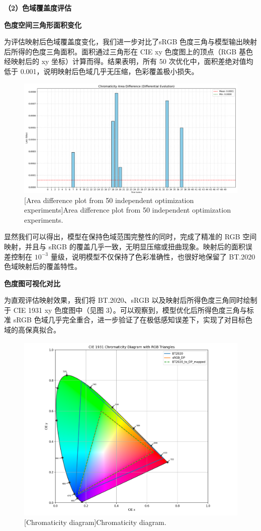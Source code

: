 \noindent\textbf{（2）色域覆盖度评估}

 \textbf{色度空间三角形面积变化}

为评估映射后色域覆盖度变化，我们进一步对比了sRGB 色度三角与模型输出映射后所得的色度三角面积。面积通过三角形在 CIE xy 色度图上的顶点（RGB 基色经映射后的 xy 坐标）计算而得。结果表明，所有 50 次优化中，面积差绝对值均低于 0.001，说明映射后色域几乎无压缩，色彩覆盖极小损失。

\begin{figure}[h]
\centering
{}
\includegraphics[width=0.8\columnwidth]{figures/面积Loss.png}
[Area difference plot from 50 independent optimization experiments]{Area difference plot from 50 independent optimization experiments.}
\label{figure3: 面积diff}
\end{figure}

显然我们可以得出，模型在保持色域范围完整性的同时，完成了精准的 RGB 空间映射，并且与 sRGB 的覆盖几乎一致，无明显压缩或扭曲现象。映射后的面积误差控制在 $10^{-3}$ 量级，说明模型不仅保持了色彩准确性，也很好地保留了 BT.2020 色域映射后的覆盖特性。

 \textbf{色度图可视化对比}

为直观评估映射效果，我们将 BT.2020、sRGB 以及映射后所得色度三角同时绘制于 CIE 1931 xy 色度图中（见图 3）。可以观察到，模型优化后所得色度三角与标准 sRGB 色域几乎完全重合，进一步验证了在极低感知误差下，实现了对目标色域的高保真拟合。

\begin{figure}[h]
\centering
{}
\includegraphics[width=0.8\columnwidth]{figures/色度.png}
[Chromaticity diagram]{Chromaticity diagram.}
\label{figure3: 色度图}
\end{figure}

